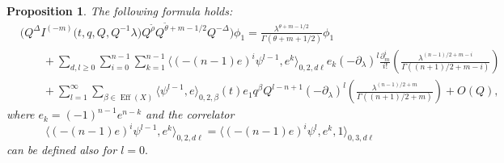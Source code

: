 \documentclass[10pt,a4paper]{article}
\numberwithin{equation}{section}
\newtheorem{Proposition}[Theorem]{Proposition}
\begin{document}
\begin{Proposition}\label{prop:Q-exp_phi1}
The following formula holds:
\begin{align}
&
\big(
Q^\Delta
I^{(-m)}\big(t,q,Q, Q^{-1}\lambda\big)
Q^{\widetilde{\rho}} Q^{\widetilde{\theta}+m-1/2}
Q^{-\Delta} \big) \phi_1 =
\frac{
\lambda^{\theta+m-1/2}
}{
\Gamma(\theta+m+1/2)} \phi_1\nonumber\\ &\qquad+
\sum_{d,l\geq 0}
\sum_{i=0}^{n-1}
\sum_{k=1}^{n-1}
\big\langle (-(n-1)e)^i \psi^{l-1}, e^k\big\rangle_{0,2,d\ell} e_k (-\partial_\lambda)^l
\frac{\partial_m^i}{i!} \left(
\frac{\lambda^{(n-1)/2+m-i}}{
\Gamma((n+1)/2+m-i) }\right)\!\! \label{Q:exp_phi1_l2}\\
&\qquad+
\sum_{l=1}^\infty
\sum_{\beta\in \operatorname{Eff}(X)}
\big\langle \psi^{l-1},e\big\rangle_{0,2,\beta}(t) e_1
q^\beta Q^{l-n+1}
(-\partial_\lambda)^l \left(
\frac{\lambda^{(n-1)/2+m}}{
\Gamma((n+1)/2+m) }\right)
+ O(Q),\label{Q:exp_phi1_l3}
\end{align}
where $e_k=(-1)^{n-1} e^{n-k}$ and the correlator
\[
\big\langle (-(n-1)e)^i \psi^{l-1}, e^k\big\rangle_{0,2,d\ell}=
\big\langle (-(n-1)e)^i \psi^{l}, e^k,1\big\rangle_{0,3,d\ell}
\]
can be defined also for $l=0.$
\end{Proposition}
\end{document}

